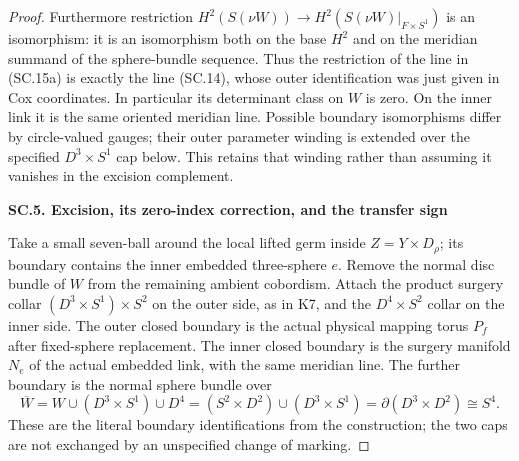 \begin{proof}
Furthermore restriction
\(H^2(S(\nu W))\to H^2(S(\nu W)|_{F\times S^1})\) is an isomorphism:
it is an isomorphism both on the base \(H^2\) and on the meridian
summand of the sphere-bundle sequence. Thus the restriction of the line
in (SC.15a) is exactly the line (SC.14), whose outer identification was
just given in Cox coordinates. In particular its determinant class on
\(W\) is zero. On the inner link it is the same oriented meridian line.
Possible boundary isomorphisms differ by circle-valued gauges; their
outer parameter winding is extended over the specified
\(D^3\times S^1\) cap below. This retains that winding rather than
assuming it vanishes in the excision complement.

\par

\medskip\noindent\textbf{SC.5. Excision, its zero-index correction, and the transfer sign}

\par\nobreak

Take a small seven-ball around the local lifted germ inside
\(Z=Y\times D_\rho\); its boundary contains the inner embedded
three-sphere \(e\). Remove the normal disc bundle of \(W\) from the
remaining ambient cobordism. Attach the product surgery collar
\((D^3\times S^1)\times S^2\) on the outer side, as in K7, and the
\(D^4\times S^2\) collar on the inner side. The outer closed boundary
is the actual physical mapping torus \(P_f\) after fixed-sphere
replacement. The inner closed boundary is the surgery manifold
\(N_e\) of the actual embedded link, with the same meridian line.
The further boundary is the normal sphere bundle over
\[
 \overline W=W\cup(D^3\times S^1)\cup D^4
       =(S^2\times D^2)\cup(D^3\times S^1)
       =\partial(D^3\times D^2)\cong S^4.            \tag{SC.16}
\]
These are the literal boundary identifications from the construction;
the two caps are not exchanged by an unspecified change of marking.


\end{proof}
